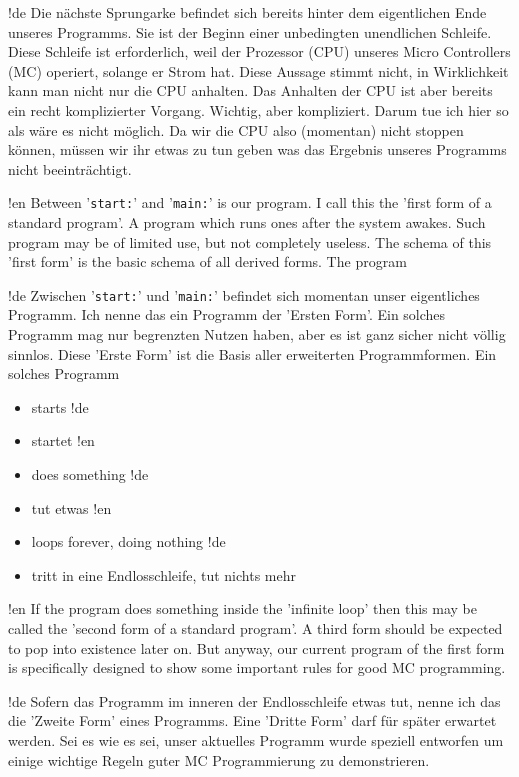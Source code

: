 !de Die nächste Sprungarke befindet sich bereits hinter dem eigentlichen Ende unseres Programms. Sie ist der Beginn einer unbedingten unendlichen Schleife. Diese Schleife ist erforderlich, weil der Prozessor (CPU) unseres Micro Controllers (MC) operiert, solange er Strom hat. Diese Aussage stimmt nicht, in Wirklichkeit kann man nicht nur die CPU anhalten. Das Anhalten der CPU ist aber bereits ein recht komplizierter Vorgang. Wichtig, aber kompliziert. Darum tue ich hier so als wäre es nicht möglich. Da wir die CPU also (momentan) nicht stoppen können, müssen wir ihr etwas zu tun geben was das Ergebnis unseres Programms nicht beeinträchtigt.



!en Between '\texttt{start:}' and '\texttt{main:}' is our program. I call this the 'first form of a standard program'. A program which runs ones after the system awakes. Such program may be of limited use, but not completely useless. The schema of this 'first form' is the basic schema of all derived forms. The program 

!de Zwischen '\texttt{start:}' und '\texttt{main:}' befindet sich momentan unser eigentliches Programm. Ich nenne das ein Programm der 'Ersten Form'. Ein solches Programm mag nur begrenzten Nutzen haben, aber es ist ganz sicher nicht völlig sinnlos. Diese 'Erste Form' ist die Basis aller erweiterten Programmformen. Ein solches Programm

\begin{itemize}
!en   \item  starts
!de   \item  startet
!en   \item  does something
!de   \item  tut etwas
!en   \item  loops forever, doing nothing
!de   \item  tritt in eine Endlosschleife, tut nichts mehr
\end{itemize}



!en If the program does something inside the 'infinite loop' then this may be called the 'second form of a standard program'. A third form should be expected to pop into existence later on. But anyway, our current program of the first form is specifically designed to show some important rules for good MC programming.

!de Sofern das Programm im inneren der Endlosschleife etwas tut, nenne ich das die 'Zweite Form' eines Programms. Eine 'Dritte Form' darf für später erwartet werden. Sei es wie es sei, unser aktuelles Programm wurde speziell entworfen um einige wichtige Regeln guter MC Programmierung zu demonstrieren.


